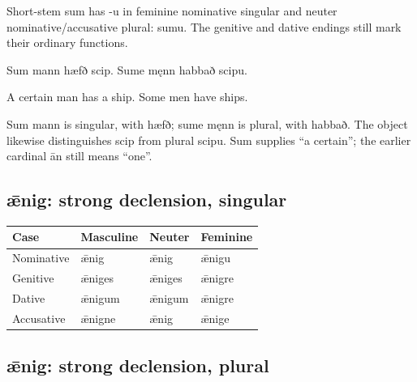 Short-stem sum has -u in feminine nominative singular and neuter nominative/\allowbreak{}accusative plural: sumu. The genitive and dative endings still mark their ordinary functions.

Sum mann hæfð scip. Sume męnn habbað scipu.

A certain man has a ship. Some men have ships.

Sum mann is singular, with hæfð; sume męnn is plural, with habbað. The object likewise distinguishes scip from plural scipu. Sum supplies “a certain”; the earlier cardinal ān still means “one”.

\subsection*{ǣnig: strong declension, singular}

\par\begingroup
\fontsize{10.5}{13.2}\selectfont
\setlength{\LTleft}{0pt}\setlength{\LTright}{\fill}
\noindent
\begin{tabular}{@{}>{\raggedright\arraybackslash}p{28.89mm}>{\raggedright\arraybackslash}p{28.89mm}>{\raggedright\arraybackslash}p{28.89mm}>{\raggedright\arraybackslash}p{28.89mm}@{}}
\toprule
\textbf{Case} & \textbf{Masculine} & \textbf{Neuter} & \textbf{Feminine} \\
\midrule
Nominative & ǣnig & ǣnig & ǣnigu \\
Genitive & ǣniges & ǣniges & ǣnigre \\
Dative & ǣnigum & ǣnigum & ǣnigre \\
Accusative & ǣnigne & ǣnig & ǣnige \\
\bottomrule
\end{tabular}
\par\endgroup

\subsection*{ǣnig: strong declension, plural}

